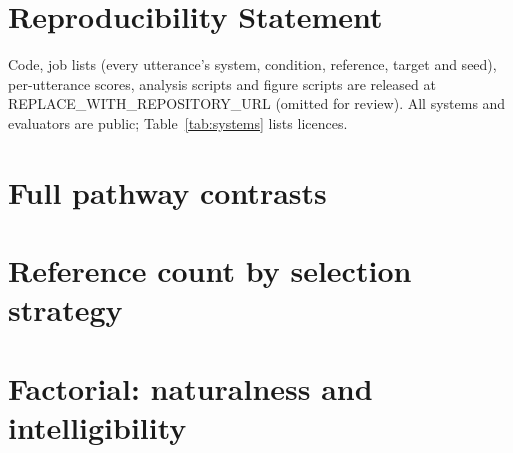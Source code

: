 \documentclass[10pt]{article}
\begin{document}
\section*{Reproducibility Statement}
Code, job lists (every utterance's system, condition, reference, target and seed), per-utterance scores, analysis scripts and figure scripts are released at REPLACE\_WITH\_REPOSITORY\_URL (omitted for review). All systems and evaluators are public; Table~\ref{tab:systems} lists licences.




\appendix

\section{Full pathway contrasts}
\label{app:contrasts}

\begin{table}[H]
\centering
\caption{x-vector only minus full, per system and dataset (speaker-level mean, 95\% bootstrap CI; $^\ast$ $p_\text{Holm}{<}0.05$). WER as a fraction, capped at 1 per utterance.}
\label{tab:contrasts}
\scriptsize
\resizebox{\textwidth}{!}{}
\end{table}

\begin{table}[H]
\centering
\caption{Speaker-level condition means.}
\label{tab:means}
\scriptsize

\end{table}

\section{Reference count by selection strategy}

\begin{table}[H]
\centering
\caption{Three references minus one, by selection strategy (speaker-level mean, 95\% bootstrap CI; $^\ast$ $p_\text{Holm}{<}0.05$ over all reference-count contrasts).}
\label{tab:refcountfull}
\scriptsize
\resizebox{\textwidth}{!}{}
\end{table}

\section{Factorial: naturalness and intelligibility}
\end{document}
